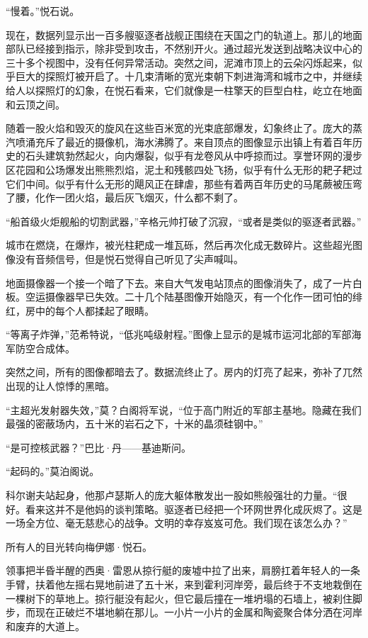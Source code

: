 \documentclass[AutoFakeBold=true]{book}
\begin{document}
``慢着。''悦石说。

现在，数据列显示出一百多艘驱逐者战舰正围绕在天国之门的轨道上。那儿的地面部队已经接到指示，除非受到攻击，不然别开火。通过超光发送到战略决议中心的三十多个视图中，没有任何异常活动。突然之间，泥滩市顶上的云朵闪烁起来，似乎巨大的探照灯被开启了。十几束清晰的宽光束朝下刺进海湾和城市之中，并继续给人以探照灯的幻象，在悦石看来，它们就像是一柱擎天的巨型白柱，屹立在地面和云顶之间。

随着一股火焰和毁灭的旋风在这些百米宽的光束底部爆发，幻象终止了。庞大的蒸汽喷涌充斥了最近的摄像机，海水沸腾了。来自顶点的图像显示出镇上有着百年历史的石头建筑勃然起火，向内爆裂，似乎有龙卷风从中呼掠而过。享誉环网的漫步区花园和公场爆发出熊熊烈焰，泥土和残骸四处飞扬，似乎有什么无形的耙子耙过它们中间。似乎有什么无形的飓风正在肆虐，那些有着两百年历史的马尾蕨被压弯了腰，化作一团火焰，最后灰飞烟灭，什么都不剩了。

``船首级火炬舰船的切割武器，''辛格元帅打破了沉寂，``或者是类似的驱逐者武器。''

城市在燃烧，在爆炸，被光柱耙成一堆瓦砾，然后再次化成无数碎片。这些超光图像没有音频信号，但是悦石觉得自己听见了尖声喊叫。

地面摄像器一个接一个暗了下去。来自大气发电站顶点的图像消失了，成了一片白板。空运摄像器早已失效。二十几个陆基图像开始隐灭，有一个化作一团可怕的绯红，房中的每个人都揉起了眼睛。

``等离子炸弹，''范希特说，``低兆吨级射程。''图像上显示的是城市运河北部的军部海军防空合成体。

突然之间，所有的图像都暗去了。数据流终止了。房内的灯亮了起来，弥补了兀然出现的让人惊悸的黑暗。

``主超光发射器失效，''莫？白阁将军说，``位于高门附近的军部主基地。隐藏在我们最强的密蔽场内，五十米的岩石之下，十米的晶须硅钢中。''

``是可控核武器？''巴比·丹——基迪斯问。

``起码的。''莫泊阁说。

科尔谢夫站起身，他那卢瑟斯人的庞大躯体散发出一股如熊般强壮的力量。``很好。看来这并不是他妈的谈判策略。驱逐者已经把一个环网世界化成灰烬了。这是一场全方位、毫无慈悲心的战争。文明的幸存岌岌可危。我们现在该怎么办？''

所有人的目光转向梅伊娜·悦石。

\vspace*{1em}

领事把半昏半醒的西奥·雷恩从掠行艇的废墟中拉了出来，肩膀扛着年轻人的一条手臂，扶着他左摇右晃地前进了五十米，来到霍利河岸旁，最后终于不支地栽倒在一棵树下的草地上。掠行艇没有起火，但它最后撞在一堆坍塌的石墙上，被刹住脚步，而现在正破烂不堪地躺在那儿。一小片一小片的金属和陶瓷聚合体分洒在河岸和废弃的大道上。
\end{document}
